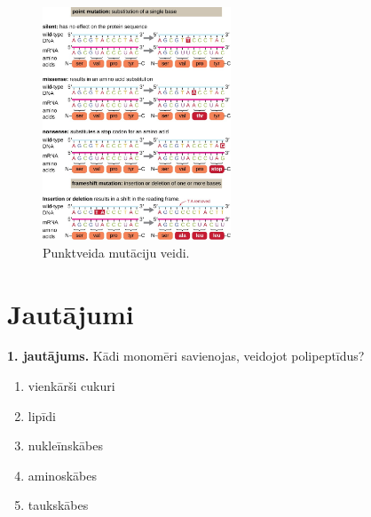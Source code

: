 \documentclass[12pt,a4paper]{article}
\begin{document}
\begin{figure}[H]
    \centering
    \includegraphics[width=0.5\textwidth]{atteli/mutācijas-1.jpg}
    \caption{Punktveida mutāciju veidi.}
    \label{fig:mutacijas}
\end{figure}

\section*{Jautājumi}

\noindent \textbf{1. jautājums.} Kādi monomēri savienojas, veidojot polipeptīdus?

\begin{enumerate}[label=\Alph*.]
    \item vienkārši cukuri
    \item lipīdi
    \item nukleīnskābes
    \item aminoskābes
    \item taukskābes
\end{enumerate}
\end{document}
